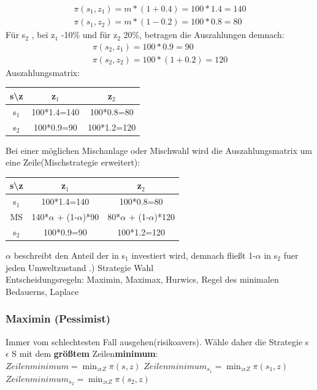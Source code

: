 \documentclass[11pt]{article}
\begin{document}
\begin{equation*}
\begin{aligned}
\pi(s_1,z_1)=m*(1+0.4)=100*1.4=140\\
\pi(s_1,z_2)=m*(1-0.2)=100*0.8=80
\end{aligned}
\end{equation*}
Für s\(_{\text{2}}\) , bei z\(_{\text{1}}\) -10\% und für z\(_{\text{2}}\) 20\%, betragen die Auszahlungen demnach:
\begin{equation*}
\begin{aligned}
\pi(s_2,z_1)=100*0.9=90\\
\pi(s_2,z_2)=100*(1+0.2)=120
\end{aligned}
\end{equation*}
Auszahlungsmatrix:
\begin{center}
\begin{tabular}{c|c|c}
s\textbackslash{z} & z\(_{\text{1}}\) & z\(_{\text{2}}\)\\
\hline
s\(_{\text{1}}\) & 100*1.4=140 & 100*0.8=80\\
s\(_{\text{2}}\) & 100*0.9=90 & 100*1.2=120\\
\end{tabular}
\end{center}
Bei einer möglichen Mischanlage oder Mischwahl wird die Auszahlungsmatrix um eine Zeile(Mischstrategie erweitert):
\begin{center}
\begin{tabular}{c|c|c}
s\textbackslash{z} & z\(_{\text{1}}\) & z\(_{\text{2}}\)\\
\hline
s\(_{\text{1}}\) & 100*1.4=140 & 100*0.8=80\\
MS & 140*\(\alpha\) + (1-\(\alpha\))*90 & 80*\(\alpha\) + (1-\(\alpha\))*120\\
s\(_{\text{2}}\) & 100*0.9=90 & 100*1.2=120\\
\end{tabular}
\end{center}
\(\alpha\) beschreibt den Anteil der in s\(_{\text{1}}\) investiert wird, demnach fließt 1-\(\alpha\) in s\(_{\text{2}}\) fuer jeden Umweltzustand
.) Strategie Wahl\\
Entscheidungsregeln: Maximin, Maximax, Hurwics, Regel des minimalen Bedauerns, Laplace\\
\subsubsection{Maximin (Pessimist)}
\label{sec:orge32e6fc}
Immer vom schlechtesten Fall ausgehen(risikoavers). Wähle daher die Strategie s \(\epsilon\) S mit dem \textbf{größtem} Zeilen\textbf{minimum}:\\
\(\displaystyle Zeilenminimum = \min_{z \epsilon Z} \pi(s,z)\)
\newline
\(\displaystyle Zeilenminimum_{s_1} = \min_{z \epsilon Z} \pi(s_1,z)\)
\newline
\(\displaystyle Zeilenminimum_{s_2} = \min_{z \epsilon Z} \pi(s_2,z)\)
\end{document}
